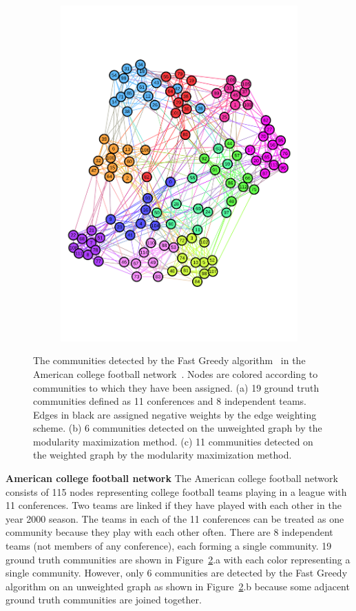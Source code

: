 \begin{figure}[!ht]
\begin{subfigure}{.3\textwidth}
\includegraphics[width=.99\linewidth]{img/chap2/football_better.pdf}
\caption{}
\label{fig:football_better}
\end{subfigure}
\caption{The communities detected by the Fast Greedy algorithm~\cite{clauset2004finding} in the American college football network~\cite{evans2010clique}. Nodes are colored according to communities to which they have been assigned. (a) 19 ground truth communities defined as 11 conferences and 8 independent teams. Edges in black are assigned negative weights by the edge weighting scheme. (b) 6 communities detected on the unweighted graph by the modularity maximization method. (c) 11 communities detected on the weighted graph by the modularity maximization method.}
\label{fig:football_convergence}
\end{figure}
\textbf{American college football network} \label{sec:football}
The American college football network~\cite{evans2010clique} consists of 115 nodes representing college football teams playing in a league with 11 conferences. Two teams are linked if they have played with each other in the year 2000 season. The teams in each of the 11 conferences can be treated as one community because they play with each other often. There are 8 independent teams (not members of any conference), each forming a single community. 19 ground truth communities are shown in Figure~\ref{fig:football_convergence}.a with each color representing a single community. However, only 6 communities are detected by the Fast Greedy algorithm on an unweighted graph as shown in Figure~\ref{fig:football_convergence}.b because some adjacent ground truth communities are joined together.
